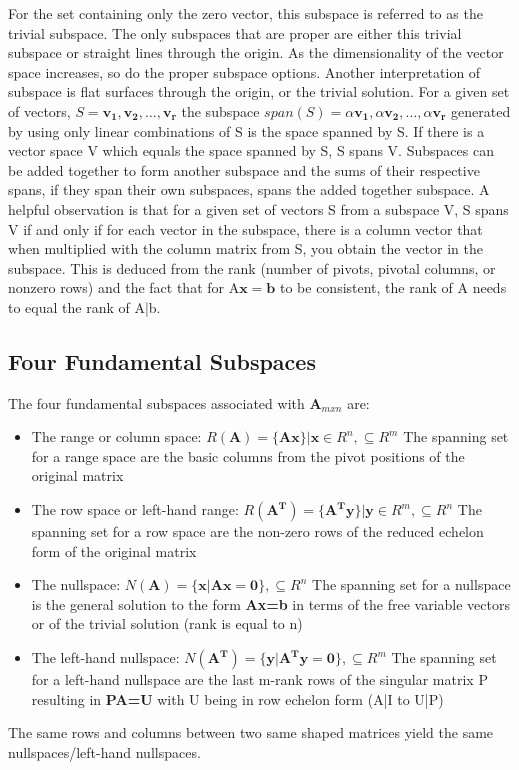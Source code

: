 \documentclass[12pt]{article}
\begin{document}
For the set containing only the zero vector, this subspace is referred to as the trivial subspace. The only subspaces that are proper are either this trivial subspace or 
straight lines through the origin. As the dimensionality of the vector space increases, so do the proper subspace options. Another interpretation of subspace is flat surfaces 
through the origin, or the trivial solution. 
\newline
\newline
For a given set of vectors, $S={\mathbf{v_1, v_2, \dotsc, v_r}}$ the subspace $span(S)={\alpha\mathbf{v_1}, \alpha\mathbf{v_2}, \dotsc, \alpha\mathbf{v_r}}$ generated by 
using only linear combinations of S is the space spanned by S. If there is a vector space V which equals the space spanned by S, S spans V. Subspaces can be added together 
to form another subspace and the sums of their respective spans, if they span their own subspaces, spans the added together subspace. 
\newline
\newline
A helpful observation is that for a given set of vectors S from a subspace V, S spans V if and only if for each vector in the subspace, there is a column vector that when 
multiplied with the column matrix from S, you obtain the vector in the subspace. This is deduced from the rank (number of pivots, pivotal columns, or nonzero rows) and 
the fact that for A$\mathbf{x=b}$ to be consistent, the rank of A needs to equal the rank of A|b. 
\subsection{Four Fundamental Subspaces}
The four fundamental subspaces associated with $\mathbf{A}_{mxn}$ are:
\begin{itemize}
    \item The range or column space: $R(\mathbf{A})=\{\mathbf{Ax}\}|\mathbf{x}\in R^n, \subseteq R^m$
    \newline
    The spanning set for a range space are the basic columns from the pivot positions of the original matrix
    \item The row space or left-hand range: $R(\mathbf{A^T})=\{\mathbf{A^Ty}\}|\mathbf{y}\in R^m, \subseteq R^n$
    \newline
    The spanning set for a row space are the non-zero rows of the reduced echelon form of the original matrix
    \item The nullspace: $N(\mathbf{A})=\{\mathbf{x}|\mathbf{Ax=0}\}, \subseteq R^n$
    \newline
    The spanning set for a nullspace is the general solution to the form \textbf{Ax=b} in terms of the free variable vectors or of the trivial solution (rank is equal to n)
    \item The left-hand nullspace: $N(\mathbf{A^T})=\{\mathbf{y}|\mathbf{A^Ty=0}\}, \subseteq R^m$
    The spanning set for a left-hand nullspace are the last m-rank rows of the singular matrix P resulting in \textbf{PA=U} with U being in row echelon form (A|I to U|P)
\end{itemize}
The same rows and columns between two same shaped matrices yield the same nullspaces/left-hand nullspaces. 
\end{document}
